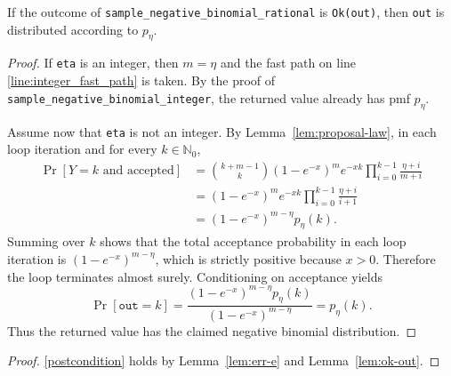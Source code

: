 \documentclass{article}
\begin{document}
\begin{lemma}
\label{lem:ok-out}
If the outcome of \texttt{sample\_negative\_binomial\_rational} is \texttt{Ok(out)}, then \texttt{out}
is distributed according to $p_\eta$.
\end{lemma}
\begin{proof}
If \texttt{eta} is an integer, then $m = \eta$ and the fast path on line \ref{line:integer_fast_path}
is taken. By the proof of \texttt{sample\_negative\_binomial\_integer}, the returned value already
has pmf $p_\eta$.

Assume now that \texttt{eta} is not an integer. By Lemma~\ref{lem:proposal-law}, in each loop iteration
and for every $k \in \mathbb{N}_0$,
\begin{align*}
\Pr[Y = k \text{ and accepted}]
&= \binom{k + m - 1}{k}(1 - e^{-x})^m e^{-xk}
   \prod_{i=0}^{k-1}\frac{\eta + i}{m + i} \\
&= (1 - e^{-x})^m e^{-xk}
   \prod_{i=0}^{k-1}\frac{\eta + i}{i + 1} \\
&= (1 - e^{-x})^{m - \eta} p_\eta(k).
\end{align*}
Summing over $k$ shows that the total acceptance probability in each loop iteration is
$(1 - e^{-x})^{m - \eta}$, which is strictly positive because $x > 0$.
Therefore the loop terminates almost surely.
Conditioning on acceptance yields
\begin{equation*}
\Pr[\texttt{out} = k]
= \frac{(1 - e^{-x})^{m - \eta} p_\eta(k)}{(1 - e^{-x})^{m - \eta}}
= p_\eta(k).
\end{equation*}
Thus the returned value has the claimed negative binomial distribution.
\end{proof}

\begin{proof}
\ref{postcondition} holds by Lemma~\ref{lem:err-e} and Lemma~\ref{lem:ok-out}.
\end{proof}
\end{document}
